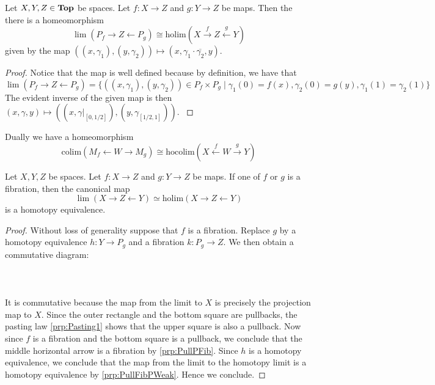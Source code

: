 \begin{prp}\label{prp:Replace2} Let $X,Y,Z\in\bold{Top}$ be spaces. Let $f:X\to Z$ and $g:Y\to Z$ be maps. Then the there is a homeomorphism $$\lim(P_f\rightarrow Z\leftarrow P_g)\cong\text{holim}(X\overset{f}{\rightarrow}Z\overset{g}{\leftarrow}Y)$$ given by the map $((x,\gamma_1),(y,\gamma_2))\mapsto(x,\gamma_1\cdot\overline{\gamma_2},y)$. 
\begin{proof}
Notice that the map is well defined because by definition, we have that $$\lim(P_f\rightarrow Z\leftarrow P_g)=\{((x,\gamma_1),(y,\gamma_2))\in P_f\times P_g\;|\;\gamma_1(0)=f(x),\gamma_2(0)=g(y),\gamma_1(1)=\gamma_2(1)\}$$ The evident inverse of the given map is then $(x,\gamma,y)\mapsto((x,\gamma|_{[0,1/2]}),(y,\gamma_{[1/2,1]}))$. \cite{CHT}
\end{proof}
\end{prp}

Dually we have a homeomorphism $$\text{colim}(M_f\leftarrow W\rightarrow M_g)\cong\text{hocolim}(X\overset{f}{\leftarrow}W\overset{g}{\rightarrow}Y)$$ 

\begin{prp}\label{prp:FibRecog} Let $X,Y,Z$ be spaces. Let $f:X\to Z$ and $g:Y\to Z$ be maps. If one of $f$ or $g$ is a fibration, then the canonical map $$\lim(X\rightarrow Z\leftarrow Y)\simeq\text{holim}(X\rightarrow Z\leftarrow Y)$$ is a homotopy equivalence. 
\begin{proof}
Without loss of generality suppose that $f$ is a fibration. Replace $g$ by a homotopy equivalence $h:Y\to P_g$ and a fibration $k:P_g\to Z$. We then obtain a commutative diagram:  
 \\~\\  \\~\\
It is commutative because the map from the limit to $X$ is precisely the projection map to $X$. Since the outer rectangle and the bottom square are pullbacks, the pasting law \ref{prp:Pasting1} shows that the upper square is also a pullback. Now since $f$ is a fibration and the bottom square is a pullback, we conclude that the middle horizontal arrow is a fibration by \ref{prp:PullPFib}. Since $h$ is a homotopy equivalence, we conclude that the map from the limit to the homotopy limit is a homotopy equivalence by \ref{prp:PullFibPWeak}. Hence we conclude. 
\end{proof}
\end{prp}

